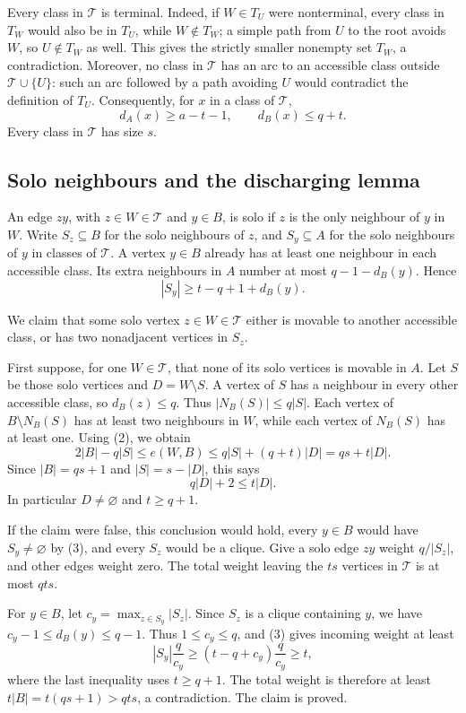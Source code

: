 Every class in \(\mathcal T\) is terminal. Indeed, if \(W\in T_U\) were nonterminal, every class in \(T_W\) would also be in \(T_U\), while \(W\notin T_W\); a simple path from \(U\) to the root avoids \(W\), so \(U\notin T_W\) as well. This gives the strictly smaller nonempty set \(T_W\), a contradiction.
Moreover, no class in \(\mathcal T\) has an arc to an accessible class outside \(\mathcal T\cup\{U\}\): such an arc followed by a path avoiding \(U\) would contradict the definition of \(T_U\).
Consequently, for \(x\) in a class of \(\mathcal T\),
\[
d_A(x)\geq a-t-1,\qquad d_B(x)\leq q+t. \tag{2}
\]
Every class in \(\mathcal T\) has size \(s\).

\subsection*{Solo neighbours and the discharging lemma}
An edge \(zy\), with \(z\in W\in\mathcal T\) and \(y\in B\), is solo if \(z\) is the only neighbour of \(y\) in \(W\). Write \(S_z\subseteq B\) for the solo neighbours of \(z\), and \(S_y\subseteq A\) for the solo neighbours of \(y\) in classes of \(\mathcal T\).
A vertex \(y\in B\) already has at least one neighbour in each accessible class. Its extra neighbours in \(A\) number at most \(q-1-d_B(y)\). Hence
\[
|S_y|\geq t-q+1+d_B(y). \tag{3}
\]

We claim that some solo vertex \(z\in W\in\mathcal T\) either is movable to another accessible class, or has two nonadjacent vertices in \(S_z\).

First suppose, for one \(W\in\mathcal T\), that none of its solo vertices is movable in \(A\). Let \(S\) be those solo vertices and \(D=W\setminus S\).
A vertex of \(S\) has a neighbour in every other accessible class, so \(d_B(z)\leq q\). Thus \(|N_B(S)|\leq q|S|\).
Each vertex of \(B\setminus N_B(S)\) has at least two neighbours in \(W\), while each vertex of \(N_B(S)\) has at least one. Using (2), we obtain
\[
2|B|-q|S|\leq e(W,B)
\leq q|S|+(q+t)|D|=qs+t|D|.
\]
Since \(|B|=qs+1\) and \(|S|=s-|D|\), this says
\[
q|D|+2\leq t|D|.
\]
In particular \(D\ne\varnothing\) and \(t\geq q+1\).

If the claim were false, this conclusion would hold, every \(y\in B\) would have \(S_y\ne\varnothing\) by (3), and every \(S_z\) would be a clique. Give a solo edge \(zy\) weight \(q/|S_z|\), and other edges weight zero.
The total weight leaving the \(ts\) vertices in \(\mathcal T\) is at most \(qts\).

For \(y\in B\), let \(c_y=\max_{z\in S_y}|S_z|\). Since \(S_z\) is a clique containing \(y\), we have \(c_y-1\leq d_B(y)\leq q-1\). Thus \(1\leq c_y\leq q\), and (3) gives incoming weight at least
\[
|S_y|\frac q{c_y}
\geq(t-q+c_y)\frac q{c_y}
\geq t,
\]
where the last inequality uses \(t\geq q+1\).
The total weight is therefore at least \(t|B|=t(qs+1)>qts\), a contradiction. The claim is proved.

